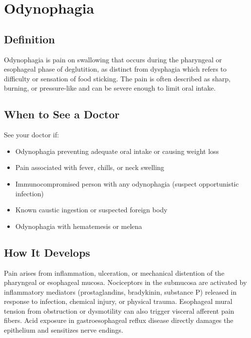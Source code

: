 \chapter{Odynophagia}

\section*{Definition}
Odynophagia is pain on swallowing that occurs during the pharyngeal or esophageal phase of deglutition, as distinct from dysphagia which refers to difficulty or sensation of food sticking. The pain is often described as sharp, burning, or pressure-like and can be severe enough to limit oral intake.

\section*{When to See a Doctor}
See your doctor if:
\begin{itemize}
  \item Odynophagia preventing adequate oral intake or causing weight loss
  \item Pain associated with fever, chills, or neck swelling
  \item Immunocompromised person with any odynophagia (suspect opportunistic infection)
  \item Known caustic ingestion or suspected foreign body
  \item Odynophagia with hematemesis or melena
\end{itemize}

\section*{How It Develops}
Pain arises from inflammation, ulceration, or mechanical distention of the pharyngeal or esophageal mucosa. Nociceptors in the submucosa are activated by inflammatory mediators (prostaglandins, bradykinin, substance P) released in response to infection, chemical injury, or physical trauma. Esophageal mural tension from obstruction or dysmotility can also trigger visceral afferent pain fibers. Acid exposure in gastroesophageal reflux disease directly damages the epithelium and sensitizes nerve endings.

